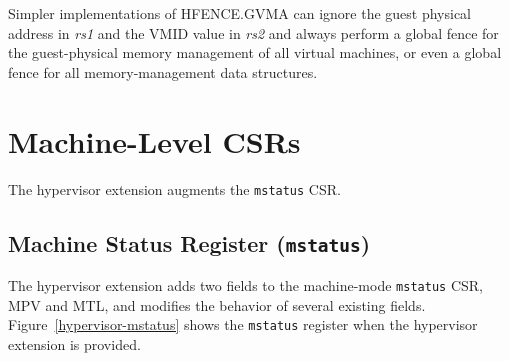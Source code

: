 \begin{commentary}
Simpler implementations of HFENCE.GVMA can ignore the guest physical address in
{\em rs1} and the VMID value in {\em rs2} and always perform a global fence for
the guest-physical memory management of all virtual machines, or even a global
fence for all memory-management data structures.
\end{commentary}

\section{Machine-Level CSRs}

The hypervisor extension augments the {\tt mstatus} CSR.

\subsection{Machine Status Register ({\tt mstatus})}

The hypervisor extension adds two fields to the machine-mode {\tt mstatus} CSR,
MPV and MTL,
and modifies the behavior of several existing fields.
Figure~\ref{hypervisor-mstatus} shows the {\tt mstatus} register when the
hypervisor extension is provided.

